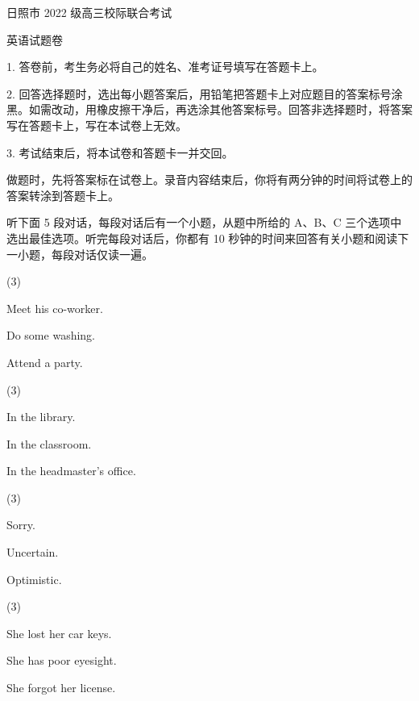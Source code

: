 \documentclass{英语试卷}
\begin{document}
\par 日照市 2022 级高三校际联合考试\par
\par 英语试题卷\par
\begin{notice}
\par 1. 答卷前，考生务必将自己的姓名、准考证号填写在答题卡上。\par
\par 2. 回答选择题时，选出每小题答案后，用铅笔把答题卡上对应题目的答案标号涂黑。如需改动，用橡皮擦干净后，再选涂其他答案标号。回答非选择题时，将答案写在答题卡上，写在本试卷上无效。\par
\par 3. 考试结束后，将本试卷和答题卡一并交回。\par
\end{notice}
\par 做题时，先将答案标在试卷上。录音内容结束后，你将有两分钟的时间将试卷上的答案转涂到答题卡上。\par
{}
\par 听下面 5 段对话，每段对话后有一个小题，从题中所给的 A、B、C 三个选项中选出最佳选项。听完每段对话后，你都有 10 秒钟的时间来回答有关小题和阅读下一小题，每段对话仅读一遍。\par
{}
\begin{choices}(3)
  \item Meet his co-worker.
  \item Do some washing.
  \item Attend a party.
\end{choices}
\begin{choices}(3)
  \item In the library.
  \item In the classroom.
  \item In the headmaster's office.
\end{choices}
\begin{choices}(3)
  \item Sorry.
  \item Uncertain.
  \item Optimistic.
\end{choices}
\begin{choices}(3)
  \item She lost her car keys.
  \item She has poor eyesight.
  \item She forgot her license.
\end{choices}
\end{document}
